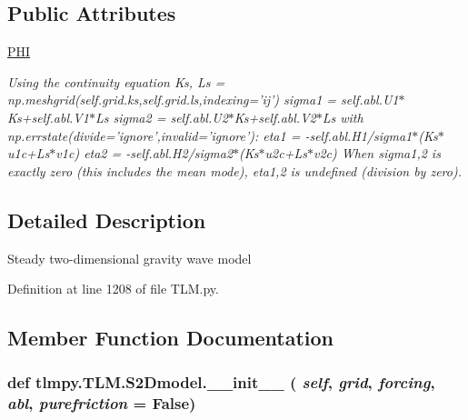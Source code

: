 \subsection*{Public Attributes}
\begin{DoxyCompactItemize}
\item 
\hyperlink{classtlmpy_1_1TLM_1_1S2Dmodel_a60e690b8ace47a52e50485876d046348}{PHI}
\begin{DoxyCompactList}\small\item\em Using the continuity equation Ks, Ls = np.meshgrid(self.grid.ks,self.grid.ls,indexing='ij') sigma1 = self.abl.U1$\ast$Ks+self.abl.V1$\ast$Ls sigma2 = self.abl.U2$\ast$Ks+self.abl.V2$\ast$Ls with np.errstate(divide='ignore',invalid='ignore'): eta1 = -\/self.abl.H1/sigma1$\ast$(Ks$\ast$u1c+Ls$\ast$v1c) eta2 = -\/self.abl.H2/sigma2$\ast$(Ks$\ast$u2c+Ls$\ast$v2c) When sigma1,2 is exactly zero (this includes the mean mode), eta1,2 is undefined (division by zero). \item\end{DoxyCompactList}\end{DoxyCompactItemize}


\subsection{Detailed Description}
\begin{DoxyVerb}
Steady two-dimensional gravity wave model
\end{DoxyVerb}
 

Definition at line 1208 of file TLM.py.

\subsection{Member Function Documentation}
\hypertarget{classtlmpy_1_1TLM_1_1S2Dmodel_ae8360d0d3e090e6209e4f85463b2e2be}{
\subsubsection[{\_\-\_\-init\_\-\_\-}]{\setlength{\rightskip}{0pt plus 5cm}def tlmpy.TLM.S2Dmodel.\_\-\_\-init\_\-\_\- ( {\em self}, \/   {\em grid}, \/   {\em forcing}, \/   {\em abl}, \/   {\em purefriction} = {\ttfamily False})}}
\label{classtlmpy_1_1TLM_1_1S2Dmodel_ae8360d0d3e090e6209e4f85463b2e2be}


